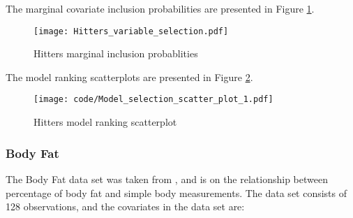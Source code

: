 \documentclass{amsart}[12pt]
\begin{document}
The marginal covariate inclusion probabilities are presented in Figure \ref{fig:Hitters_inclusion}.

\begin{figure}[p]
	\texttt{[image: Hitters\_variable\_selection.pdf]}
	\caption{Hitters marginal inclusion probablities}
	\label{fig:Hitters_inclusion}
\end{figure}

The model ranking scatterplots are presented in Figure \ref{fig:Hitters_model_ranking}.



\begin{figure}[p]
	\texttt{[image: code/Model\_selection\_scatter\_plot\_1.pdf]}
	\caption{Hitters model ranking scatterplot}
	\label{fig:Hitters_model_ranking}
\end{figure}

\subsubsection{Body Fat}
The Body Fat data set was taken from \cite{Tarr2015}, and is on the relationship between percentage of body
fat and simple body measurements. The data set consists of 128 observations, and the covariates in the data set
are:
\end{document}
